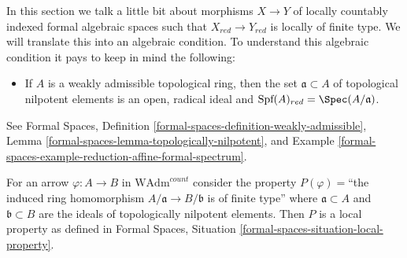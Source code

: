 \noindent
In this section we talk a little bit about morphisms $X \to Y$
of locally countably indexed formal algebraic spaces such that
$X_{red} \to Y_{red}$ is locally of finite type. We will translate
this into an algebraic condition. To understand this algebraic
condition it pays to keep in mind the following:
\begin{itemize}
\item If $A$ is a weakly admissible topological ring, then the
set $\mathfrak a \subset A$ of topological nilpotent elements
is an open, radical ideal and
$\text{Spf}(A)_{red} = \Spec(A/\mathfrak a)$.
\end{itemize}
See Formal Spaces, Definition
\ref{formal-spaces-definition-weakly-admissible},
Lemma \ref{formal-spaces-lemma-topologically-nilpotent}, and
Example \ref{formal-spaces-example-reduction-affine-formal-spectrum}.

\begin{lemma}
\label{lemma-finite-type-red}
For an arrow $\varphi : A \to B$ in $\text{WAdm}^{count}$ consider
the property $P(\varphi)=$``the induced ring homomorphism
$A/\mathfrak a \to B/\mathfrak b$ is of finite type''
where $\mathfrak a \subset A$ and $\mathfrak b \subset B$ are the ideals
of topologically nilpotent elements. Then $P$ is a local property
as defined in
Formal Spaces, Situation
\ref{formal-spaces-situation-local-property}.
\end{lemma}


